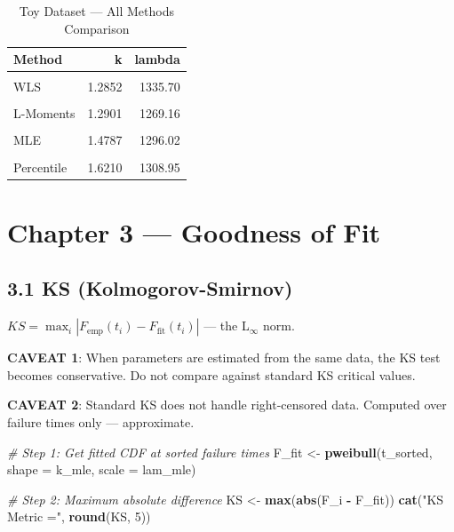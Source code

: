 \documentclass[
]{article}
\newenvironment{Shaded}{\begin{snugshade}}{\end{snugshade}}
\newcommand{\AttributeTok}[1]{\textcolor[rgb]{0.13,0.29,0.53}{#1}}
\newcommand{\CommentTok}[1]{\textcolor[rgb]{0.56,0.35,0.01}{\textit{#1}}}
\newcommand{\DecValTok}[1]{\textcolor[rgb]{0.00,0.00,0.81}{#1}}
\newcommand{\FunctionTok}[1]{\textcolor[rgb]{0.13,0.29,0.53}{\textbf{#1}}}
\newcommand{\NormalTok}[1]{#1}
\newcommand{\OtherTok}[1]{\textcolor[rgb]{0.56,0.35,0.01}{#1}}
\newcommand{\SpecialCharTok}[1]{\textcolor[rgb]{0.81,0.36,0.00}{\textbf{#1}}}
\newcommand{\StringTok}[1]{\textcolor[rgb]{0.31,0.60,0.02}{#1}}
\begin{document}
\begin{longtable}[t]{lrr}
\caption{\label{tab:toy-summary}Toy Dataset — All Methods Comparison}\\
\toprule
Method & k & lambda\\
\midrule
\cellcolor{gray!10}{OLS} & \cellcolor{gray!10}{1.1881} & \cellcolor{gray!10}{1345.69}\\
WLS & 1.2852 & 1335.70\\
\cellcolor{gray!10}{MOM} & \cellcolor{gray!10}{1.4369} & \cellcolor{gray!10}{1293.12}\\
L-Moments & 1.2901 & 1269.16\\
\cellcolor{gray!10}{EPF} & \cellcolor{gray!10}{1.5718} & \cellcolor{gray!10}{1307.20}\\
\addlinespace
MLE & 1.4787 & 1296.02\\
\cellcolor{gray!10}{MAP} & \cellcolor{gray!10}{1.3810} & \cellcolor{gray!10}{1207.62}\\
Percentile & 1.6210 & 1308.95\\
\bottomrule
\end{longtable}

\newpage

\section{Chapter 3 --- Goodness of Fit}\label{chapter-3-goodness-of-fit}

\subsection{3.1 KS (Kolmogorov-Smirnov)}\label{ks-kolmogorov-smirnov}

\(KS = \max_i |F_{\text{emp}}(t_i) - F_{\text{fit}}(t_i)|\) --- the
L\(_\infty\) norm.

\textbf{CAVEAT 1}: When parameters are estimated from the same data, the
KS test becomes conservative. Do not compare against standard KS
critical values.

\textbf{CAVEAT 2}: Standard KS does not handle right-censored data.
Computed over failure times only --- approximate.

\begin{Shaded}
\begin{Highlighting}[]
\CommentTok{\# Step 1: Get fitted CDF at sorted failure times}
\NormalTok{F\_fit }\OtherTok{\textless{}{-}} \FunctionTok{pweibull}\NormalTok{(t\_sorted, }\AttributeTok{shape =}\NormalTok{ k\_mle, }\AttributeTok{scale =}\NormalTok{ lam\_mle)}

\CommentTok{\# Step 2: Maximum absolute difference}
\NormalTok{KS }\OtherTok{\textless{}{-}} \FunctionTok{max}\NormalTok{(}\FunctionTok{abs}\NormalTok{(F\_i }\SpecialCharTok{{-}}\NormalTok{ F\_fit))}
\FunctionTok{cat}\NormalTok{(}\StringTok{"KS Metric ="}\NormalTok{, }\FunctionTok{round}\NormalTok{(KS, }\DecValTok{5}\NormalTok{))}
\end{Highlighting}
\end{Shaded}
\end{document}
